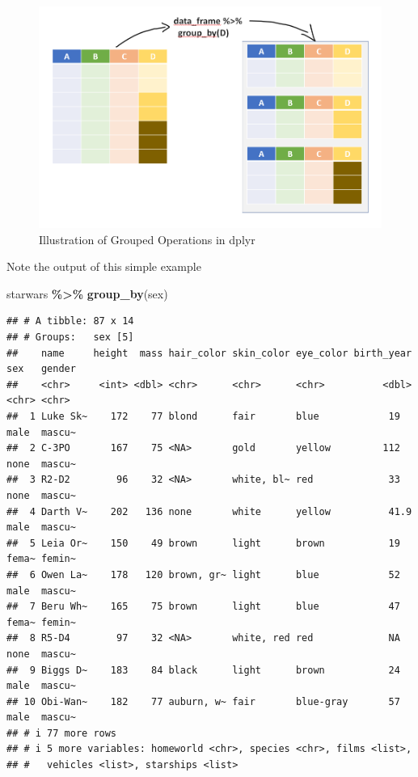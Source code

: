 \documentclass[
]{book}
\newenvironment{Shaded}{\begin{snugshade}}{\end{snugshade}}
\newcommand{\FunctionTok}[1]{\textcolor[rgb]{0.13,0.29,0.53}{\textbf{#1}}}
\newcommand{\NormalTok}[1]{#1}
\newcommand{\SpecialCharTok}[1]{\textcolor[rgb]{0.81,0.36,0.00}{\textbf{#1}}}
\begin{document}
\begin{figure}

{\centering \includegraphics[width=0.99\linewidth]{images/groupby_dplyr} 

}

\caption{Illustration of Grouped Operations in dplyr}\label{fig:groupby}
\end{figure}

Note the output of this simple example

\begin{Shaded}
\begin{Highlighting}[]
\NormalTok{starwars }\SpecialCharTok{\%\textgreater{}\%} 
  \FunctionTok{group\_by}\NormalTok{(sex)}
\end{Highlighting}
\end{Shaded}

\begin{verbatim}
## # A tibble: 87 x 14
## # Groups:   sex [5]
##    name     height  mass hair_color skin_color eye_color birth_year sex   gender
##    <chr>     <int> <dbl> <chr>      <chr>      <chr>          <dbl> <chr> <chr> 
##  1 Luke Sk~    172    77 blond      fair       blue            19   male  mascu~
##  2 C-3PO       167    75 <NA>       gold       yellow         112   none  mascu~
##  3 R2-D2        96    32 <NA>       white, bl~ red             33   none  mascu~
##  4 Darth V~    202   136 none       white      yellow          41.9 male  mascu~
##  5 Leia Or~    150    49 brown      light      brown           19   fema~ femin~
##  6 Owen La~    178   120 brown, gr~ light      blue            52   male  mascu~
##  7 Beru Wh~    165    75 brown      light      blue            47   fema~ femin~
##  8 R5-D4        97    32 <NA>       white, red red             NA   none  mascu~
##  9 Biggs D~    183    84 black      light      brown           24   male  mascu~
## 10 Obi-Wan~    182    77 auburn, w~ fair       blue-gray       57   male  mascu~
## # i 77 more rows
## # i 5 more variables: homeworld <chr>, species <chr>, films <list>,
## #   vehicles <list>, starships <list>
\end{verbatim}
\end{document}
